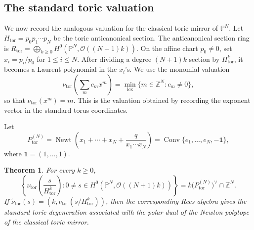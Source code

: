 \documentclass{article}
\newtheorem{thm}{Theorem}[section]
\newcommand{\ZZ}{\mathbb{Z}}
\newcommand{\PP}{\mathbb{P}}
\begin{document}
\subsection{The standard toric valuation}
We now record the analogous valuation for the classical toric mirror of \(\PP^N\). Let \(H_{\mathrm{tor}}=p_0p_1\cdots p_N\) be the toric anticanonical section. The anticanonical section ring is \(R_{\mathrm{tor}}=\bigoplus_{k\ge0}H^0(\PP^N,\mathcal O((N+1)k))\). On the affine chart \(p_0\ne0\), set \(x_i=p_i/p_0\) for \(1\le i\le N\).
After dividing a degree \((N+1)k\) section by \(H_{\mathrm{tor}}^k\), it becomes a Laurent polynomial in the \(x_i\)'s. We use the monomial valuation
\[
\nu_{\mathrm{tor}}\left(\sum_m c_mx^m\right)
=
\min_{\mathrm{lex}}\{m\in\ZZ^N:c_m\ne0\},
\]
so that \(\nu_{\mathrm{tor}}(x^m)=m\). This is the valuation obtained by recording the exponent vector in the standard torus coordinates.

Let
\[
P_{\mathrm{tor}}^{(N)}
=
\operatorname{Newt}\left(x_1+\cdots+x_N+\frac{q}{x_1\cdots x_N}\right)
=
\operatorname{Conv}\{e_1,\ldots,e_N,-\mathbf 1\},
\]
where \(\mathbf 1=(1,\ldots,1)\).

\begin{thm}\label{thm:standard-toric-valuation}
For every \(k\ge0\),
\[
\left\{
\nu_{\mathrm{tor}}\left(\frac{s}{H_{\mathrm{tor}}^k}\right):
0\ne s\in H^0(\PP^N,\mathcal O((N+1)k))
\right\}
=
k\bigl(P_{\mathrm{tor}}^{(N)}\bigr)^\vee\cap\ZZ^N.
\]
If \(\widetilde\nu_{\mathrm{tor}}(s)=(k,\nu_{\mathrm{tor}}(s/H_{\mathrm{tor}}^k))\), then the corresponding Rees algebra gives the standard toric degeneration associated with the polar dual of the Newton polytope of the classical toric mirror.
\end{thm}
\end{document}
